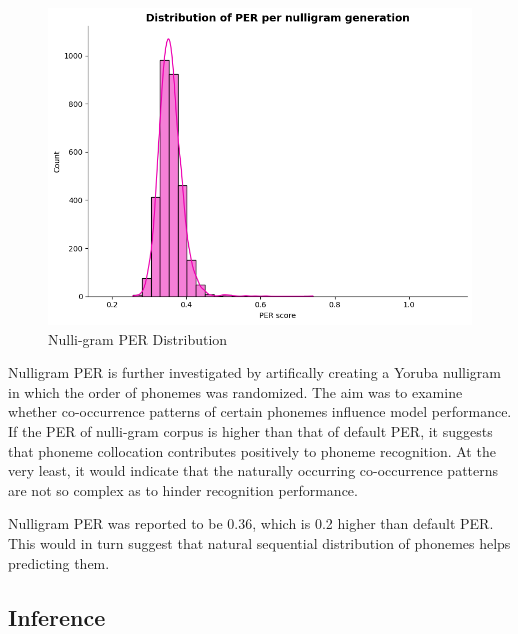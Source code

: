 \documentclass[11pt]{article}
\begin{document}
{\begin{figure}
    \centering
    \includegraphics[width=0.75\linewidth]{nulligramPERdistribution.png}
    \caption{Nulli-gram PER Distribution}
    \label{fig:placeholder}
\end{figure}
Nulligram PER is further investigated by artifically creating a Yoruba nulligram in which the order of phonemes was randomized. The aim was to examine whether co-occurrence patterns of certain phonemes influence model performance. If the PER of nulli-gram corpus is higher than that of default PER, it suggests that phoneme collocation contributes positively to phoneme recognition. At the very least, it would indicate that the naturally occurring co-occurrence patterns are not so complex as to hinder recognition performance.

Nulligram PER was reported to be 0.36, which is 0.2 higher than default PER. This would in turn suggest that natural sequential distribution of phonemes helps predicting them.


\subsection{Inference}

}
\end{document}
